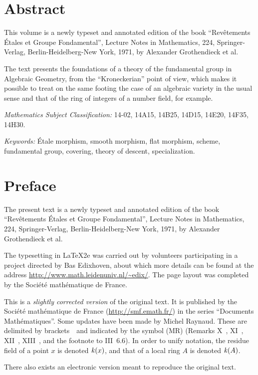 
\chapter*{Abstract}

This volume is a newly typeset and annotated edition of the book
``Rev\^etements \'Etales et Groupe Fondamental'', Lecture Notes in
Mathematics, 224, Springer-Verlag, Berlin-Heidelberg-New York, 1971, by
Alexander Grothendieck et al.

The text presents the foundations of a theory of the fundamental group
in Algebraic Geometry, from the ``Kroneckerian'' point of view, which
makes it possible to treat on the same footing the case of an algebraic
variety in the usual sense and that of the ring of integers of a number
field, for example.

\medskip
\noindent\emph{Mathematics Subject Classification:} 14-02, 14A15, 14B25,
14D15, 14E20, 14F35, 14H30.

\smallskip
\noindent\emph{Keywords:} \'Etale morphism, smooth morphism, flat
morphism, scheme, fundamental group, covering, theory of descent,
specialization.

\chapter*{Preface}

The present text is a newly typeset and annotated edition of the book
``Rev\^etements \'Etales et Groupe Fondamental'', Lecture Notes in
Mathematics, 224, Springer-Verlag, Berlin-Heidelberg-New York, 1971, by
Alexander Grothendieck et al.

The typesetting in \LaTeX 2e was carried out by volunteers participating
in a project directed by Bas Edixhoven, about which more details can be
found at the address \url{http://www.math.leidenuniv.nl/~edix/}. The
page layout was completed by the \hbox{Soci\'et\'e} math\'ematique de
France.

This is a \emph{slightly corrected version} of the original text. It is
published by the \hbox{Soci\'et\'e} math\'ematique de France
(\url{http://smf.emath.fr/}) in the series ``Documents
\hbox{Math\'ematiques}''. Some updates have been made by Michel Raynaud.
These are delimited by brackets \lcrochetbf\,\rcrochetbf\ and indicated
by the symbol (MR)
(Remarks X~, XI~, XII~,
XIII~, and the footnote to III~6.6).
In order to unify notation, the residue field of a point $x$ is denoted
$\mathit{k}(x)$, and that of a local ring $A$ is denoted $\mathit{k}(A)$.\par
There also exists an electronic version meant to reproduce the original
text.

